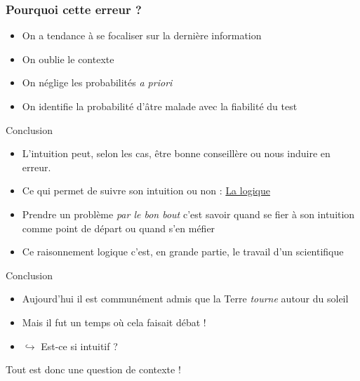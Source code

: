 \documentclass[usenames, dvipsnames]{beamer}
\begin{document}
\begin{frame}[plain]
\frametitle{Pourquoi cette erreur ?}






\vspace{2cm}

\begin{itemize}
\item<2-> On a tendance à se focaliser sur la dernière information
\item<3-> On oublie le contexte
\item<4-> On néglige les probabilités \textit{a priori}
\item<5-> On identifie la probabilité d'âtre malade avec la fiabilité du test
\end{itemize}


\end{frame}


\begin{frame}[plain]{Conclusion}
\begin{itemize}
\item L'intuition peut, selon les cas, être bonne conseillère ou nous induire en erreur. \pause
\item Ce qui permet de suivre son intuition ou non : \underline{La logique} \pause 
\item Prendre un problème \textit{par le bon bout} c'est savoir quand se fier à son intuition comme point de départ ou quand s'en méfier \pause 
\item Ce raisonnement logique c'est, en grande partie, le travail d'un scientifique
\end{itemize}



\end{frame}




\begin{frame}[plain]{Conclusion}

\begin{itemize}
\item Aujourd'hui il est communément admis que la Terre \textit{tourne} autour du soleil \pause
\item Mais il fut un temps où cela faisait débat ! \pause
\item $\hookrightarrow$ Est-ce si intuitif ? \pause 
\end{itemize}


\vspace{2cm} Tout est donc une question de contexte ! 
\end{frame}
\end{document}
